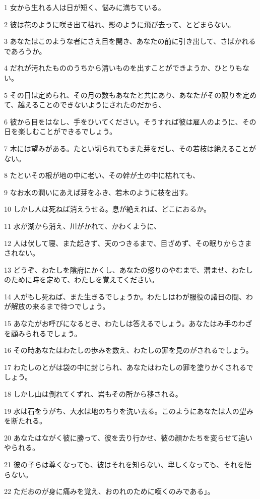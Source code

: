 \par 1 女から生れる人は日が短く、悩みに満ちている。
\par 2 彼は花のように咲き出て枯れ、影のように飛び去って、とどまらない。
\par 3 あなたはこのような者にさえ目を開き、あなたの前に引き出して、さばかれるであろうか。
\par 4 だれが汚れたもののうちから清いものを出すことができようか、ひとりもない。
\par 5 その日は定められ、その月の数もあなたと共にあり、あなたがその限りを定めて、越えることのできないようにされたのだから、
\par 6 彼から目をはなし、手をひいてください。そうすれば彼は雇人のように、その日を楽しむことができるでしょう。
\par 7 木には望みがある。たとい切られてもまた芽をだし、その若枝は絶えることがない。
\par 8 たといその根が地の中に老い、その幹が土の中に枯れても、
\par 9 なお水の潤いにあえば芽をふき、若木のように枝を出す。
\par 10 しかし人は死ねば消えうせる。息が絶えれば、どこにおるか。
\par 11 水が湖から消え、川がかれて、かわくように、
\par 12 人は伏して寝、また起きず、天のつきるまで、目ざめず、その眠りからさまされない。
\par 13 どうぞ、わたしを陰府にかくし、あなたの怒りのやむまで、潜ませ、わたしのために時を定めて、わたしを覚えてください。
\par 14 人がもし死ねば、また生きるでしょうか。わたしはわが服役の諸日の間、わが解放の来るまで待つでしょう。
\par 15 あなたがお呼びになるとき、わたしは答えるでしょう。あなたはみ手のわざを顧みられるでしょう。
\par 16 その時あなたはわたしの歩みを数え、わたしの罪を見のがされるでしょう。
\par 17 わたしのとがは袋の中に封じられ、あなたはわたしの罪を塗りかくされるでしょう。
\par 18 しかし山は倒れてくずれ、岩もその所から移される。
\par 19 水は石をうがち、大水は地のちりを洗い去る。このようにあなたは人の望みを断たれる。
\par 20 あなたはながく彼に勝って、彼を去り行かせ、彼の顔かたちを変らせて追いやられる。
\par 21 彼の子らは尊くなっても、彼はそれを知らない、卑しくなっても、それを悟らない。
\par 22 ただおのが身に痛みを覚え、おのれのために嘆くのみである」。

